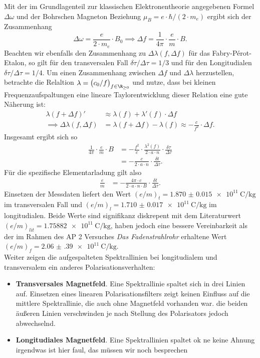 \documentclass[../main.tex]{subfiles}
\begin{document}
    Mit der im Grundlagenteil zur klassischen Elektronentheorie angegebenen Formel $\Delta\omega$ und der Bohrschen Magneton Beziehung $\mu_B = e\cdot\hbar/(2\cdot m_e)$ ergibt sich der Zusammenhang
    \[
        \Delta\omega = \frac{e}{2\cdot m_e}\cdot B_0 \implies \Delta f=\frac{1}{4\pi}\cdot\frac{e}{m}\cdot B.
    \]
    Beachten wir ebenfalls den Zusammenhang zu $\Delta\lambda(f,\Delta f)$ für das Fabry-Pérot-Etalon, so gilt für den transversalen Fall $\delta\tau/\Delta\tau=1/3$ und für den Longitudialen $\delta\tau/\Delta\tau=1/4$. Um einen Zusammenhang zwischen $\Delta f$ und $\Delta\lambda$ herzustellen, betrachte die Relaltion $\lambda=\big(c_0/f\big)_{f\in\R_{\geq 0}}$ und nutze, dass bei kleinen Frequenzaufspaltungen eine lineare Taylorentwicklung dieser Relation eine gute Näherung ist:
    \begin{align*}
        \lambda(f+\Delta f)' &\approx \lambda(f) + \lambda'(f)\cdot\Delta f\\
        \implies \Delta \lambda(f,\Delta f) &= \lambda(f+\Delta f) - \lambda(f) \approx -\frac{c}{f^2}\cdot\Delta f.
    \end{align*}
    Insgesamt ergibt sich so 
    \begin{align*}
        \frac{1}{4\pi}\cdot\frac{e}{m}\cdot B &= -\frac{f^2}{c}\cdot \frac{\lambda^2(f)}{2\cdot a\cdot n}\cdot\frac{\delta\tau}{\Delta\tau}\\
        &= -\frac{c}{2\cdot a\cdot n}\cdot\frac{\delta t}{\Delta\tau}.
    \end{align*}
    Für die spezifische Elementarladung gilt also
    \begin{align*}
        \frac{e}{m} &= -\frac{4\pi\cdot c}{2\cdot a\cdot n\cdot B}\cdot\frac{\delta t}{\Delta\tau}.
    \end{align*}
    Einsetzen der Messdaten liefert den Wert $(e/m)_t=\SI{1.870(15)e11}{\coulomb\per\kilo\gram}$ im transversalen Fall und $(e/m)_l=\SI{1.710(17)e11}{\coulomb\per\kilo\gram}$ im longitudialen. Beide Werte sind signifikanz diskrepent mit dem Literaturwert $(e/m)_{lit}=\SI{1.75882e11}{\coulomb\per\kilo\gram}$, haben jedoch eine bessere Vereinbarkeit als der im Rahmen des AP 2 Versuches \textit{Das Fadenstrahlrohr} erhaltene Wert $(e/m)_f=\SI{2.06(39)e11}{\coulomb\per\kilo\gram}$.\\

    \noindent Weiter zeigen die aufgespalteten Spektrallinien bei longitudialem und transversalem ein anderes Polarisationsverhalten:
    \begin{itemize}
        \item \textbf{Transversales Magnetfeld}. Eine Spektrallinie spaltet sich in drei Linien auf. Einsetzen eines linearen Polarisationsfilters zeigt keinen Einfluss auf die mittlere Spektrallinie, die auch ohne Magnetfeld vorhanden war. die beiden äußeren Linien verschwinden je nach Stellung des Polarisators jedoch abwechselnd.\\
        \item \textbf{Longitudiales Magnetfeld}. Eine Spektrallinien spaltet ok ne keine Ahnung irgendwas ist hier faul, das müssen wir noch besprechen
    \end{itemize}
\end{document}
